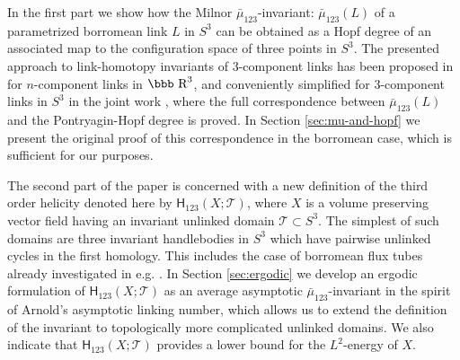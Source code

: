 \documentclass[12pt]{article}
\newcommand{\R}{\mbox{\bbb R}}       %
\begin{document}
In the first part we show how the Milnor $\bar{\mu}_{123}$-invariant: $\bar{\mu}_{123}(L)$ of a parametrized borromean link $L$ in $S^3$ can be obtained as a Hopf degree of an associated map to the configuration space of three points in $S^3$. The presented approach to link-homotopy invariants of 3-component links has been proposed in \cite{Kohno02} for $n$-component links in $\R^3$, and conveniently simplified for 3-component links in $S^3$ in the joint work \cite{Deturck-Gluck-Melvin-Shonkwiler08}, where the full correspondence between $\bar{\mu}_{123}(L)$ and the Pontryagin-Hopf degree is proved. In Section \ref{sec:mu-and-hopf} we present the original proof of this correspondence in the borromean case, which is sufficient for our purposes.  

The second part of the paper is concerned with a new definition of the third order helicity denoted here by $\mathsf{H}_{123}(X;\mathcal{T})$, where $X$ is a volume preserving vector field having an invariant unlinked domain $\mathcal{T}\subset S^3$. The simplest of such domains are three invariant 
handlebodies in $S^3$ which have pairwise unlinked 
cycles in the first homology. This includes the case of borromean flux tubes already investigated in e.g. \cite{Berger90, Laurence-Stredulinsky00b}. In Section \ref{sec:ergodic}  we develop an ergodic formulation of $\mathsf{H}_{123}(X;\mathcal{T})$ as an average asymptotic $\bar{\mu}_{123}$-invariant in the spirit of Arnold's asymptotic linking number, which allows us to extend the definition of the invariant to topologically more complicated unlinked domains. We also indicate that $\mathsf{H}_{123}(X;\mathcal{T})$ provides a lower 
bound for the $L^2$-energy of $X$. 

\end{document}
